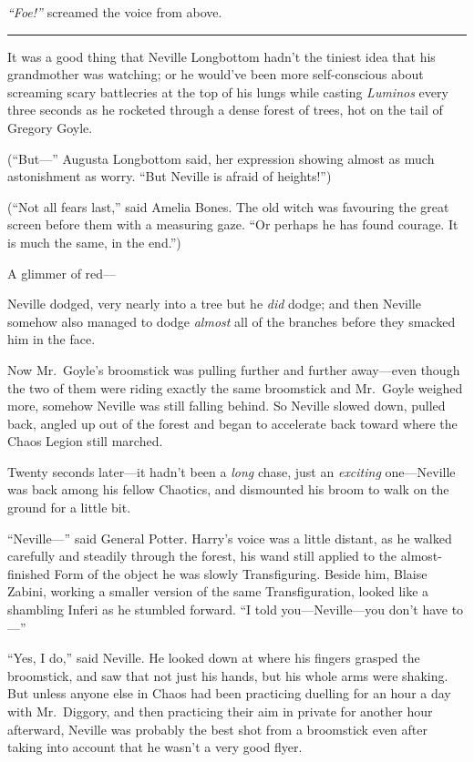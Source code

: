 \emph{``Foe!''} screamed the voice from above.

\begin{center}\rule{3in}{0.4pt}\end{center}

It was a good thing that Neville Longbottom hadn't the tiniest idea that
his grandmother was watching; or he would've been more self-conscious
about screaming scary battlecries at the top of his lungs while casting
\emph{Luminos} every three seconds as he rocketed through a dense forest
of trees, hot on the tail of Gregory Goyle.

(``But---'' Augusta Longbottom said, her expression showing almost as
much astonishment as worry. ``But Neville is afraid of heights!'')

(``Not all fears last,'' said Amelia Bones. The old witch was favouring
the great screen before them with a measuring gaze. ``Or perhaps he has
found courage. It is much the same, in the end.'')

A glimmer of red---

Neville dodged, very nearly into a tree but he \emph{did} dodge; and
then Neville somehow also managed to dodge \emph{almost} all of the
branches before they smacked him in the face.

Now Mr.~Goyle's broomstick was pulling further and further away---even
though the two of them were riding exactly the same broomstick and
Mr.~Goyle weighed more, somehow Neville was still falling behind. So
Neville slowed down, pulled back, angled up out of the forest and began
to accelerate back toward where the Chaos Legion still marched.

Twenty seconds later---it hadn't been a \emph{long} chase, just an
\emph{exciting} one---Neville was back among his fellow Chaotics, and
dismounted his broom to walk on the ground for a little bit.

``Neville---'' said General Potter. Harry's voice was a little distant,
as he walked carefully and steadily through the forest, his wand still
applied to the almost-finished Form of the object he was slowly
Transfiguring. Beside him, Blaise Zabini, working a smaller version of
the same Transfiguration, looked like a shambling Inferi as he stumbled
forward. ``I told you---Neville---you don't have to---''

``Yes, I do,'' said Neville. He looked down at where his fingers grasped
the broomstick, and saw that not just his hands, but his whole arms were
shaking. But unless anyone else in Chaos had been practicing duelling
for an hour a day with Mr.~Diggory, and then practicing their aim in
private for another hour afterward, Neville was probably the best shot
from a broomstick even after taking into account that he wasn't a very
good flyer.

